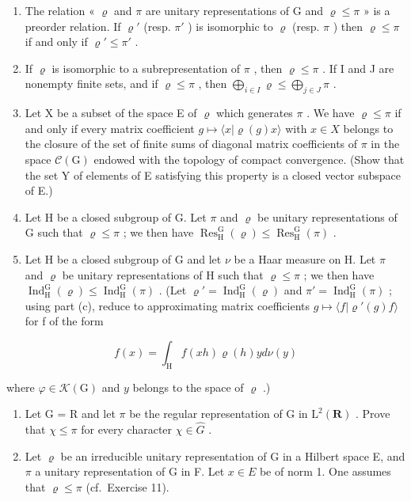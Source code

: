 \begin{enumerate}
\def\labelenumi{\alph{enumi})}
\item
  The relation « \(\varrho\) and \(\pi\) are unitary representations of G and \(\varrho \leqslant \pi\) » is a preorder relation. If \(\varrho'\) (resp. \(\pi'\) ) is isomorphic to \(\varrho\) (resp. \(\pi\) ) then \(\varrho \leqslant \pi\) if and only if \(\varrho' \leqslant \pi'\) .
\item
  If \(\varrho\) is isomorphic to a subrepresentation of \(\pi\) , then \(\varrho \leqslant \pi\) . If I and J are nonempty finite sets, and if \(\varrho \leqslant \pi\) , then \(\bigoplus_{i \in I} \varrho \leqslant \bigoplus_{j \in J} \pi\) .
\item
  Let X be a subset of the space E of \(\varrho\) which generates \(\pi\) . We have \(\varrho \leqslant \pi\) if and only if every matrix coefficient \(g \mapsto \langle x | \varrho(g)x \rangle\) with \(x \in X\) belongs to the closure of the set of finite sums of diagonal matrix coefficients of \(\pi\) in the space \(\mathcal{C}(\mathrm{G})\) endowed with the topology of compact convergence. (Show that the set Y of elements of E satisfying this property is a closed vector subspace of E.)
\item
  Let H be a closed subgroup of G. Let \(\pi\) and \(\varrho\) be unitary representations of G such that \(\varrho \leqslant \pi\) ; we then have \(\operatorname{Res}_{\mathrm{H}}^{\mathrm{G}}(\varrho) \leqslant \operatorname{Res}_{\mathrm{H}}^{\mathrm{G}}(\pi)\) .
\item
  Let H be a closed subgroup of G and let \(\nu\) be a Haar measure on H. Let \(\pi\) and \(\varrho\) be unitary representations of H such that \(\varrho \leqslant \pi\) ; we then have \(\operatorname{Ind}_{\mathrm{H}}^{\mathrm{G}}(\varrho) \leqslant \operatorname{Ind}_{\mathrm{H}}^{\mathrm{G}}(\pi)\) . (Let \(\varrho' = \operatorname{Ind}_{\mathrm{H}}^{\mathrm{G}}(\varrho)\) and \(\pi' = \operatorname{Ind}_{\mathrm{H}}^{\mathrm{G}}(\pi)\) ; using part (c), reduce to approximating matrix coefficients \(g \mapsto \langle f | \varrho'(g)f \rangle\) for f of the form
\end{enumerate}

\[
f (x) = \int_ {\mathrm{H}} f (x h) \varrho (h) y d \nu (y)
\]

where \(\varphi\in\mathcal{K}(\mathrm{G})\) and \(y\) belongs to the space of \(\varrho\) .)

\begin{enumerate}
\def\labelenumi{\arabic{enumi})}
\setcounter{enumi}{11}
\item
  Let G = R and let \(\pi\) be the regular representation of G in \(\mathrm{L}^{2}(\mathbf{R})\) . Prove that \(\chi \leqslant \pi\) for every character \(\chi \in \widehat{G}\) .
\item
  Let \(\varrho\) be an irreducible unitary representation of G in a Hilbert space E, and \(\pi\) a unitary representation of G in F. Let \(x \in E\) be of norm 1. One assumes that \(\varrho \leqslant \pi\) (cf.~Exercise 11).
\end{enumerate}

